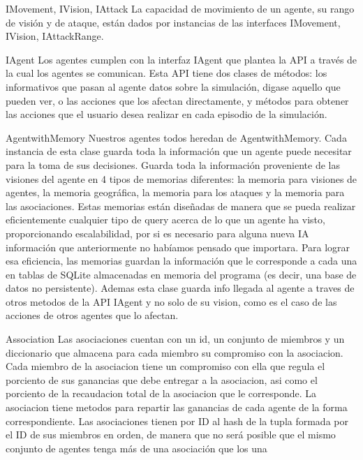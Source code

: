\documentclass{beamer}
\begin{document}
\begin{frame}{IMovement, IVision, IAttack}
  La capacidad de movimiento de un agente, su rango de visión y de ataque, están dados por instancias de las interfaces IMovement, IVision, IAttack\textunderscore Range.
\end{frame}

\begin{frame}{IAgent}
  Los agentes cumplen con la interfaz IAgent que plantea la API a través de la cual los agentes se comunican. Esta API tiene dos clases de métodos: los informativos que pasan al agente datos sobre la simulación, digase aquello que pueden ver, o las acciones que los afectan directamente, y métodos para obtener las acciones que el usuario desea realizar en cada episodio de la simulación.
\end{frame}

\begin{frame}{Agent\textunderscore with\textunderscore Memory}
  Nuestros agentes todos heredan de Agent\textunderscore with\textunderscore Memory. Cada instancia de esta clase guarda toda la información que un agente puede necesitar para la toma de sus decisiones. Guarda toda la información proveniente de las visiones del agente en 4 tipos de memorias diferentes: la memoria para visiones de agentes, la memoria geográfica, la memoria para los ataques y la memoria para las asociaciones. Estas memorias están diseñadas de manera que se pueda realizar eficientemente cualquier tipo de query acerca de lo que un agente ha visto, proporcionando escalabilidad, por si es necesario para alguna nueva IA información que anteriormente no habíamos pensado que importara. Para lograr esa eficiencia, las memorias guardan la información que le corresponde a cada una en tablas de SQLite almacenadas en memoria del programa (es decir, una base de datos no persistente). Ademas esta clase guarda info llegada al agente a traves de otros metodos de la API IAgent y no solo de su vision, como es el caso de las acciones de otros agentes que lo afectan.
\end{frame}

\begin{frame}{Association}
  Las asociaciones cuentan con un id, un conjunto de miembros y un diccionario que almacena para cada miembro su compromiso con la asociacion. Cada miembro de la asociacion tiene un compromiso con ella que regula el porciento de sus ganancias que debe entregar a la asociacion, asi como el porciento de la recaudacion total de la asociacion que le corresponde. La asociacion tiene metodos para repartir las ganancias de cada agente de la forma correspondiente. Las asociaciones tienen por ID al hash de la tupla formada por el ID de sus miembros en orden, de manera que no será posible que el mismo conjunto de agentes tenga más de una asociación que los una
\end{frame}
\end{document}
